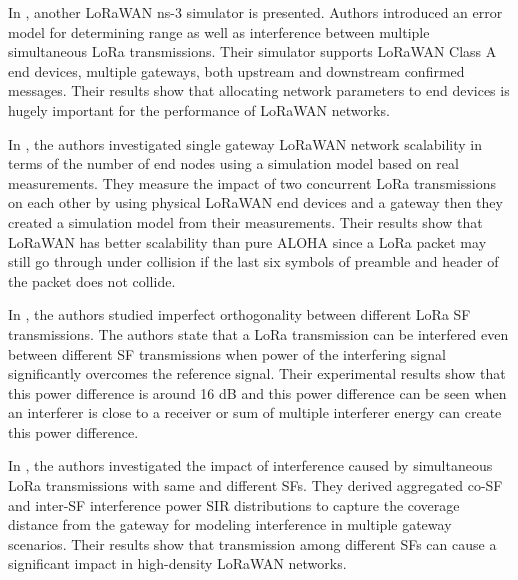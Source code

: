 \documentclass[conference]{IEEEtran}
\begin{document}
\par In \cite{8090518}, another LoRaWAN ns-3 simulator is presented. Authors introduced an error model for determining range as well as interference between multiple simultaneous LoRa transmissions. Their simulator supports LoRaWAN Class A end devices, multiple gateways, both upstream and downstream confirmed messages. Their results show that allocating network parameters to end devices is hugely important for the performance of LoRaWAN networks.

\par In \cite{s17061193}, the authors investigated single gateway LoRaWAN network scalability in terms of the number of end nodes using a simulation model based on real measurements. They measure the impact of two concurrent LoRa transmissions on each other by using physical LoRaWAN end devices and a gateway then they created a simulation model from their measurements. Their results show that LoRaWAN has better scalability than pure ALOHA since a LoRa packet may still go through under collision if the last six symbols of preamble and header of the packet does not collide.

\par In \cite{8267219}, the authors studied imperfect orthogonality between different LoRa SF transmissions. The authors state that a LoRa transmission can be interfered even between different SF transmissions when power of the interfering signal significantly overcomes the reference signal. Their experimental results show that this power difference is around 16 dB and this power difference can be seen when an interferer is close to a receiver or sum of multiple interferer energy can create this power difference.

\par In \cite{8430542}, the authors investigated the impact of interference caused by simultaneous LoRa transmissions with same and different SFs. They derived aggregated co-SF and inter-SF interference power SIR distributions to capture the coverage distance from the gateway for modeling interference in multiple gateway scenarios. Their results show that transmission among different SFs can cause a significant impact in high-density LoRaWAN networks.
\end{document}
